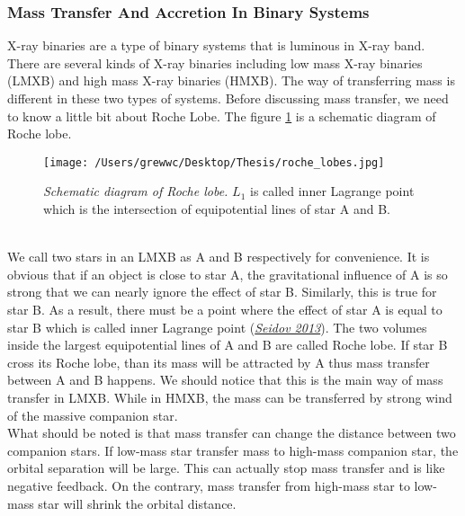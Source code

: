\documentclass[12pt]{report}
\begin{document}
            \subsubsection{Mass Transfer And Accretion In Binary Systems}
                X-ray binaries are a type of binary systems that is luminous in X-ray band. There are several kinds 
                of X-ray binaries including low mass X-ray binaries (LMXB) and high mass X-ray binaries (HMXB). 
                The way of transferring mass is different in these two types of systems. Before discussing mass 
                transfer, we need to know a little bit about Roche Lobe. The figure \ref{fig:roche lobe} is a 
                schematic diagram of Roche lobe.
                \begin{figure}[h]
                  \centering
                  \texttt{[image: /Users/grewwc/Desktop/Thesis/roche\_lobes.jpg]}
                  \begin{minipage}{0.8\textwidth}
                  \caption{\footnotesize \textit{Schematic diagram of Roche lobe.} $L_{1}$ is called inner 
                            Lagrange point which is the intersection of equipotential lines of star A 
                            and B.}
                  \label{fig:roche lobe}
                  \end{minipage}
                \end{figure}\\
                \indent  We call two stars in an LMXB as A and B respectively for convenience. It is obvious 
                that if an object is close to star A, the gravitational influence of A is so strong that we can 
                nearly ignore the effect of star B. Similarly, this is true for star B. As a result, there must be 
                a point where the effect of star A is equal to star B which is called inner Lagrange point 
                \hypersetup{urlcolor= red}
                (\href{https://arxiv.org/pdf/astro-ph/0311272.pdf}{\textit{Seidov 2013}}). The two
                volumes inside the largest equipotential lines of A and B are called Roche lobe. If star B cross 
                its Roche lobe, than its mass will be attracted by A thus mass transfer between A and B happens. We 
                should notice that this is the main way of mass transfer in LMXB. While in HMXB, the mass can be 
                transferred by strong wind of the massive companion star. \\
                \indent 
                What should be noted is that mass transfer can change the distance between two companion stars. If 
                low-mass star transfer mass to high-mass companion star, the orbital separation will be large. 
                This can actually stop mass transfer and is like negative feedback. 
                On the contrary, mass transfer from high-mass star to low-mass star will shrink the orbital 
                distance.\\
                       
\end{document}
